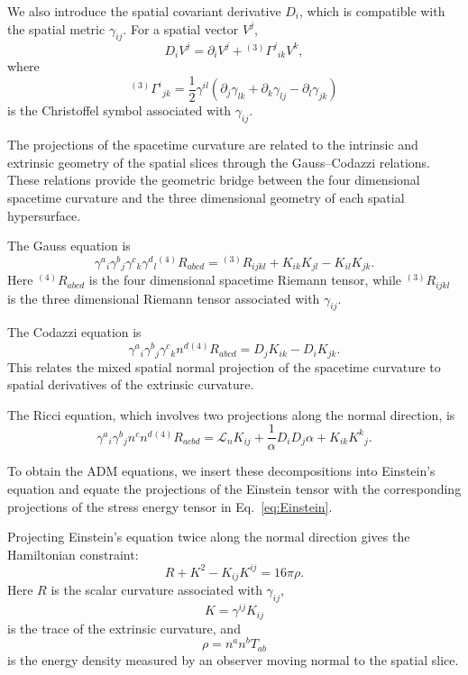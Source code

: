 We also introduce the spatial covariant derivative $D_i$, which is compatible with the spatial metric $\gamma_{ij}$. For a spatial vector $V^j$,
\begin{equation}
D_i V^j
=
\partial_i V^j
+
{}^{(3)}\Gamma^j{}_{ik} V^k ,
\end{equation}
where
\begin{equation}
{}^{(3)}\Gamma^i{}_{jk}
=
\frac{1}{2}\gamma^{il}
\left(
\partial_j \gamma_{lk}
+
\partial_k \gamma_{lj}
-
\partial_l \gamma_{jk}
\right)
\end{equation}
is the Christoffel symbol associated with $\gamma_{ij}$.

The projections of the spacetime curvature are related to the intrinsic and extrinsic geometry of the spatial slices through the Gauss--Codazzi relations. These relations provide the geometric bridge between the four dimensional spacetime curvature and the three dimensional geometry of each spatial hypersurface.

The Gauss equation is
\begin{equation}
\gamma^a{}_{i}
\gamma^b{}_{j}
\gamma^c{}_{k}
\gamma^d{}_{l}
{}^{(4)}R_{abcd}
=
{}^{(3)}R_{ijkl}
+
K_{ik}K_{jl}
-
K_{il}K_{jk}.
\end{equation}
Here ${}^{(4)}R_{abcd}$ is the four dimensional spacetime Riemann tensor, while ${}^{(3)}R_{ijkl}$ is the three dimensional Riemann tensor associated with $\gamma_{ij}$.

The Codazzi equation is
\begin{equation}
\gamma^a{}_{i}
\gamma^b{}_{j}
\gamma^c{}_{k}
n^d
{}^{(4)}R_{abcd}
=
D_j K_{ik}
-
D_i K_{jk}.
\end{equation}
This relates the mixed spatial normal projection of the spacetime curvature to spatial derivatives of the extrinsic curvature.

The Ricci equation, which involves two projections along the normal direction, is
\begin{equation}
\gamma^a{}_{i}
\gamma^b{}_{j}
n^c n^d
{}^{(4)}R_{acbd}
=
\mathcal{L}_n K_{ij}
+
\frac{1}{\alpha}D_iD_j\alpha
+
K_{ik}K^k{}_{j}.
\end{equation}

To obtain the ADM equations, we insert these decompositions into Einstein's equation and equate the projections of the Einstein tensor with the corresponding projections of the stress energy tensor in Eq.~\eqref{eq:Einstein}.

Projecting Einstein's equation twice along the normal direction gives the Hamiltonian constraint:
\begin{equation}
R + K^2 - K_{ij}K^{ij}
=
16\pi \rho .
\label{eq:hamiltonian}
\end{equation}
Here $R$ is the scalar curvature associated with $\gamma_{ij}$,
\begin{equation}
K = \gamma^{ij}K_{ij}
\end{equation}
is the trace of the extrinsic curvature, and
\begin{equation}
\rho = n^a n^b T_{ab}
\end{equation}
is the energy density measured by an observer moving normal to the spatial slice.

